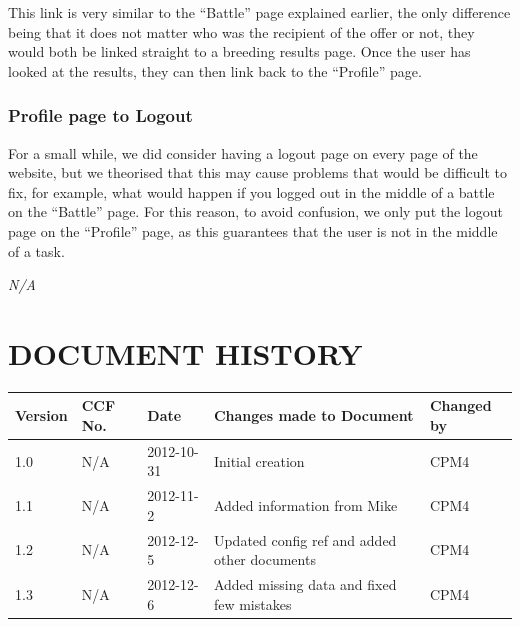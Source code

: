 \documentclass{project}
\begin{document}
This link is very similar to the “Battle” page explained earlier, the only difference being that it does not matter who was the recipient of the offer or not, they would both be linked straight to a breeding results page. Once the user has looked at the results, they can then link back to the “Profile” page.

\subsubsection{Profile page to Logout}
For a small while, we did consider having a logout page on every page of the website, but we theorised that this may cause problems that would be difficult to fix, for example, what would happen if you logged out in the middle of a battle on the “Battle” page. For this reason, to avoid confusion, we only put the logout page on the “Profile” page, as this guarantees that the user is not in the middle of a task. 

\clearpage
{}
\begin{thebibliography}{5}
\bibitem{} \emph{N/A}
\end{thebibliography}
\clearpage
{}
\section*{DOCUMENT HISTORY}
\begin{tabular}{|l | l | l | l | l |}
\hline
Version & CCF No. & Date & Changes made to Document & Changed by \\
\hline
1.0 & N/A & 2012-10-31 & Initial creation & CPM4 \\
\hline
1.1 & N/A & 2012-11-2 & Added information from Mike & CPM4 \\
\hline
1.2 & N/A & 2012-12-5 & Updated config ref and added other documents & CPM4 \\
\hline
1.3 & N/A & 2012-12-6 & Added missing data and fixed few mistakes & CPM4 \\
\hline
\end{tabular}
\label{thelastpage}
\end{document}
